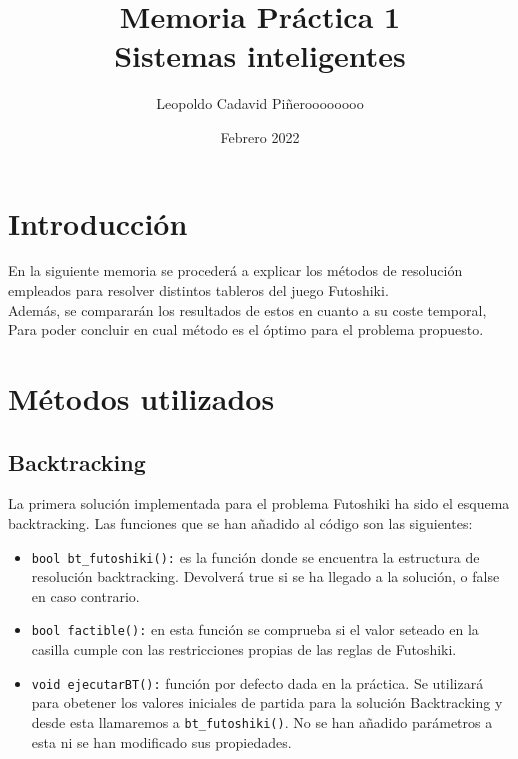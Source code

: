 \documentclass[12pt]{article}
\title{Memoria Práctica 1 \\


\large Sistemas inteligentes
}
\author{
Leopoldo Cadavid Piñeroooooooo
}
\date{Febrero 2022}
\begin{document}
\maketitle

\section{Introducción}

      En la siguiente memoria se procederá a explicar los métodos de resolución
      empleados para resolver distintos tableros del juego Futoshiki.\\

      Además, se compararán los resultados de estos en cuanto a su coste temporal,
      Para poder concluir en cual método es el óptimo para el problema propuesto. 
      

\section{Métodos utilizados}

\subsection{Backtracking}
La primera solución implementada para el problema Futoshiki ha sido el 
esquema backtracking. Las funciones que se han añadido al código son las 
siguientes:\\
\begin{itemize}
    \item \verb|bool bt_futoshiki():| es la función donde se encuentra la estructura
     de resolución backtracking. Devolverá true si se ha llegado a la solución, o false 
     en caso contrario. 

    \item \verb|bool factible():| en esta función se comprueba si el valor 
    seteado en la casilla cumple con las restricciones propias de las reglas de Futoshiki.

    \item \verb|void ejecutarBT():| función por defecto dada en la práctica. Se utilizará
    para obetener los valores iniciales de partida para la solución Backtracking
    y desde esta llamaremos a \verb|bt_futoshiki()|. No se han añadido parámetros a esta ni se han 
    modificado sus propiedades.

    
\end{itemize}

\end{document}
